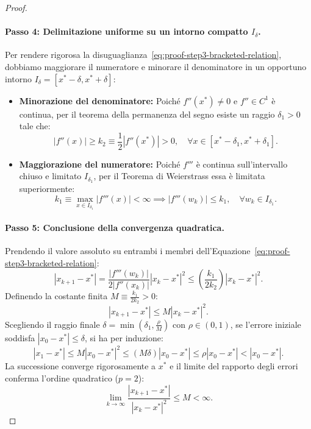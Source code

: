 \begin{proof}
\paragraph{Passo 4: Delimitazione uniforme su un intorno compatto $I_\delta$.}
Per rendere rigorosa la disuguaglianza~\eqref{eq:proof-step3-bracketed-relation}, dobbiamo maggiorare il numeratore e minorare il denominatore in un opportuno intorno $I_\delta = [x^* - \delta, x^* + \delta]$:
\begin{itemize}
    \item \textbf{Minorazione del denominatore:} Poich\'e $f''(x^*) \ne 0$ e $f'' \in C^1$ \`e continua, per il teorema della permanenza del segno esiste un raggio $\delta_1 > 0$ tale che:
    \begin{equation}
        |f''(x)| \ge k_2 \equiv \frac{1}{2} |f''(x^*)| > 0, \quad \forall x \in [x^* - \delta_1, x^* + \delta_1].
    \end{equation}
    \item \textbf{Maggiorazione del numeratore:} Poich\'e $f'''$ \`e continua sull'intervallo chiuso e limitato $I_{\delta_1}$, per il Teorema di Weierstrass essa \`e limitata superiormente:
    \begin{equation}
        k_1 \equiv \max_{x \in I_{\delta_1}} |f'''(x)| < \infty \implies |f'''(w_k)| \le k_1, \quad \forall w_k \in I_{\delta_1}.
    \end{equation}
\end{itemize}

\paragraph{Passo 5: Conclusione della convergenza quadratica.}
Prendendo il valore assoluto su entrambi i membri dell'Equazione~\eqref{eq:proof-step3-bracketed-relation}:
\begin{equation}
    |x_{k+1} - x^*| = \frac{|f'''(w_k)|}{2 |f''(x_k)|} |x_k - x^*|^2 \le \left( \frac{k_1}{2 k_2} \right) |x_k - x^*|^2.
\end{equation}
Definendo la costante finita $M \equiv \frac{k_1}{2 k_2} > 0$:
\begin{equation}
    |x_{k+1} - x^*| \le M |x_k - x^*|^2.
\end{equation}
Scegliendo il raggio finale $\delta = \min(\delta_1, \frac{\rho}{M})$ con $\rho \in (0, 1)$, se l'errore iniziale soddisfa $|x_0 - x^*| \le \delta$, si ha per induzione:
\begin{equation}
    |x_1 - x^*| \le M |x_0 - x^*|^2 \le (M \delta) |x_0 - x^*| \le \rho |x_0 - x^*| < |x_0 - x^*|.
\end{equation}
La successione converge rigorosamente a $x^*$ e il limite del rapporto degli errori conferma l'ordine quadratico ($p = 2$):
\begin{equation}
    \lim_{k \to \infty} \frac{|x_{k+1} - x^*|}{|x_k - x^*|^2} \le M < \infty.
\end{equation}
\end{proof}

